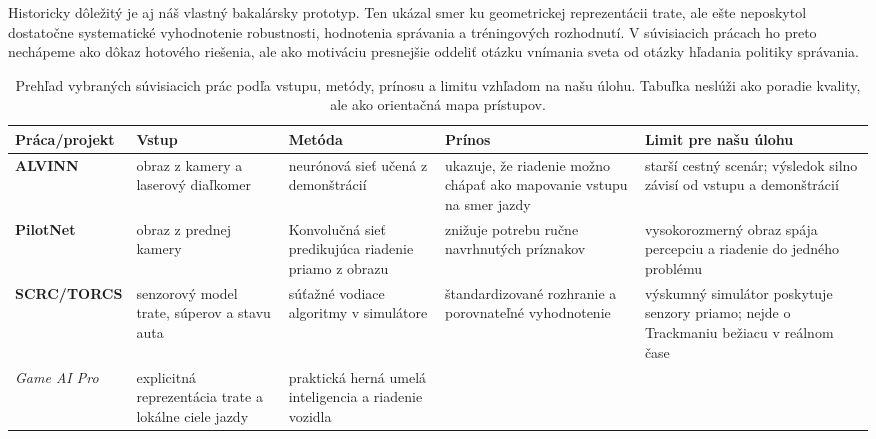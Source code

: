 Historicky dôležitý je aj náš vlastný bakalársky prototyp. Ten ukázal smer ku geometrickej reprezentácii trate, ale ešte neposkytol dostatočne systematické vyhodnotenie robustnosti, hodnotenia správania a tréningových rozhodnutí. V súvisiacich prácach ho preto nechápeme ako dôkaz hotového riešenia, ale ako motiváciu presnejšie oddeliť otázku vnímania sveta od otázky hľadania politiky správania.

\begin{table}[htbp]
    \centering
    \scriptsize
    \setlength{\tabcolsep}{3pt}
    \renewcommand{\arraystretch}{1.18}
    \caption[Prehľad vybraných súvisiacich prác]{Prehľad vybraných súvisiacich prác podľa vstupu, metódy, prínosu a limitu vzhľadom na našu úlohu. Tabuľka neslúži ako poradie kvality, ale ako orientačná mapa prístupov.}
    \label{tab:related_work_overview}
    \begin{tabular}{>{\raggedright\arraybackslash}p{}
                    >{\raggedright\arraybackslash}p{}
                    >{\raggedright\arraybackslash}p{}
                    >{\raggedright\arraybackslash}p{}
                    >{\raggedright\arraybackslash}p{}}
        \toprule
        Práca/projekt & Vstup & Metóda & Prínos & Limit pre našu úlohu \\
        \midrule
        \textbf{ALVINN} \cite{pomerleau1989alvinn} &
        obraz z kamery a laserový diaľkomer &
        neurónová sieť učená z demonštrácií &
        ukazuje, že riadenie možno chápať ako mapovanie vstupu na smer jazdy &
        starší cestný scenár; výsledok silno závisí od vstupu a demonštrácií \\
        \textbf{PilotNet} \cite{bojarski2016endtoend} &
        obraz z prednej kamery &
        Konvolučná sieť predikujúca riadenie priamo z obrazu &
        znižuje potrebu ručne navrhnutých príznakov &
        vysokorozmerný obraz spája percepciu a riadenie do jedného problému \\
        \textbf{SCRC/TORCS} \cite{loiacono2010scrc, wymann2000torcs} &
        senzorový model trate, súperov a stavu auta &
        súťažné vodiace algoritmy v simulátore &
        štandardizované rozhranie a porovnateľné vyhodnotenie &
        výskumný simulátor poskytuje senzory priamo; nejde o Trackmaniu bežiacu v reálnom čase \\
        \emph{Game AI Pro} \cite{game_ai_pro_racetrack2013} &
        explicitná reprezentácia trate a lokálne ciele jazdy &
        praktická herná umelá inteligencia a riadenie vozidla &

\end{tabular}
\end{table}
